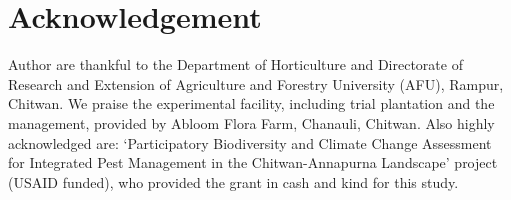 \documentclass[]{article}
\begin{document}
\section{Acknowledgement}\label{acknowledgement}

Author are thankful to the Department of Horticulture and Directorate of
Research and Extension of Agriculture and Forestry University (AFU),
Rampur, Chitwan. We praise the experimental facility, including trial
plantation and the management, provided by Abloom Flora Farm, Chanauli,
Chitwan. Also highly acknowledged are: `Participatory Biodiversity and
Climate Change Assessment for Integrated Pest Management in the
Chitwan-Annapurna Landscape' project (USAID funded), who provided the
grant in cash and kind for this study.
\end{document}
